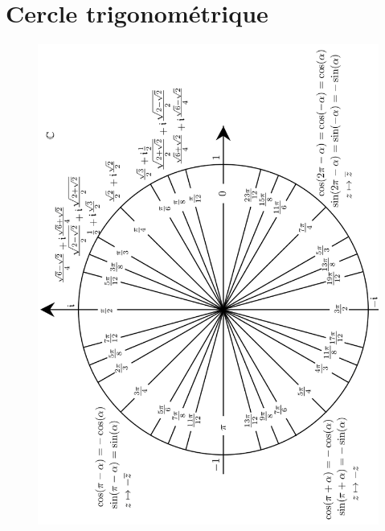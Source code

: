 \documentclass[a4paper,10pt]{book}
\begin{document}
\section{Cercle trigonométrique}
\label{Cercle trigo}
\begin{center} \begin{figure}[!h] \includegraphics[scale=0.525]{images/205.png} \end{figure} \end{center}

\newpage



\end{document}

